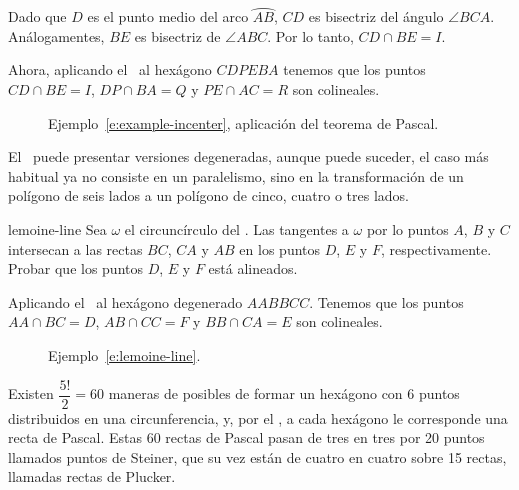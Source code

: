 \begin{solution}
    Dado que $D$ es el punto medio del arco $\wideparen{AB}$, $CD$ es bisectriz del ángulo $\angle BCA$.
    Análogamentes, $BE$ es bisectriz de $\angle ABC$.
    Por lo tanto, $CD \cap BE = I$.

    Ahora, aplicando el~ al hexágono $CDPEBA$ tenemos que los puntos $CD \cap BE = I$, $DP \cap BA = Q$ y $PE \cap AC = R$ son colineales.
\end{solution}

\begin{figure}[H]
    \centering
    
    \caption{Ejemplo~\ref{e:example-incenter}, aplicación del teorema de Pascal.}
\end{figure}


El~ puede presentar versiones degeneradas, aunque puede suceder, el caso más habitual ya no consiste en un paralelismo, sino en la transformación de un polígono de seis lados a un polígono de cinco, cuatro o tres lados.


\begin{section-example.tcb}{}{lemoine-line}
    Sea $\omega$ el circuncírculo del .
    Las tangentes a $\omega$ por lo puntos $A$, $B$ y $C$ intersecan a las rectas $BC$, $CA$ y $AB$ en los puntos $D$, $E$ y $F$, respectivamente.
    Probar que los puntos $D$, $E$ y $F$ está alineados.
\end{section-example.tcb}

\begin{solution}
    Aplicando el~ al hexágono degenerado $AABBCC$.
    Tenemos que los puntos $AA \cap BC = D$, $AB \cap CC = F$ y $BB \cap CA = E$ son colineales.
\end{solution}

\begin{figure}[H]
    \centering
    
    \caption{Ejemplo~\ref{e:lemoine-line}.}
\end{figure}

Existen $\dfrac{5!}{2} = 60$ maneras de posibles de formar un hexágono con 6 puntos distribuidos en una circunferencia, y, por el , a cada hexágono le corresponde una recta de Pascal.
Estas 60 rectas de Pascal pasan de tres en tres por 20 puntos llamados puntos de Steiner, que su vez están de cuatro en cuatro sobre 15 rectas, llamadas rectas de Plucker.



